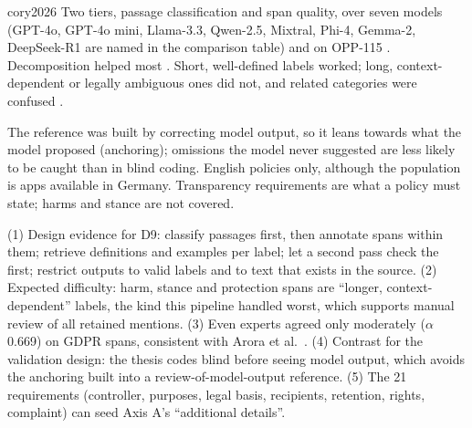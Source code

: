 \begin{papercard}{cory2026}
 Two tiers, passage classification and span quality, over seven models (GPT-4o, GPT-4o mini, Llama-3.3, Qwen-2.5, Mixtral, Phi-4, Gemma-2, DeepSeek-R1 are named in the comparison table) and on OPP-115 . Decomposition helped most . Short, well-defined labels worked; long, context-dependent or legally ambiguous ones did not, and related categories were confused .

 The reference was built by correcting model output, so it leans towards what the model proposed (anchoring); omissions the model never suggested are less likely to be caught than in blind coding. English policies only, although the population is apps available in Germany. Transparency requirements are what a policy must state; harms and stance are not covered.

 (1) Design evidence for D9: classify passages first, then annotate spans within them; retrieve definitions and examples per label; let a second pass check the first; restrict outputs to valid labels and to text that exists in the source. (2) Expected difficulty: harm, stance and protection spans are ``longer, context-dependent'' labels, the kind this pipeline handled worst, which supports manual review of all retained mentions. (3) Even experts agreed only moderately ($\alpha$ 0.669) on GDPR spans, consistent with Arora et al.\ . (4) Contrast for the validation design: the thesis codes blind before seeing model output, which avoids the anchoring built into a review-of-model-output reference. (5) The 21 requirements (controller, purposes, legal basis, recipients, retention, rights, complaint) can seed Axis A's ``additional details''.
\end{papercard}
